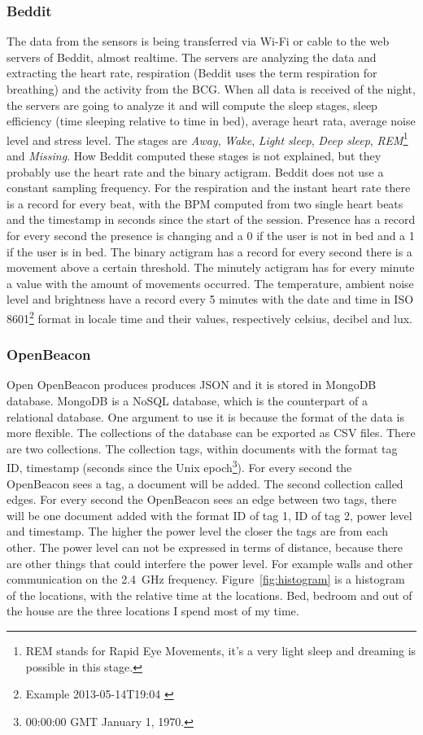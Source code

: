 		\subsubsection{Beddit}
		\label{sec:datadescriptionbeddit}
		The data from the sensors is being transferred via Wi-Fi or cable to the web servers of Beddit, almost realtime. The servers are analyzing the data and extracting the heart rate, respiration (Beddit uses the term respiration for breathing) and the activity from the BCG. When all data is received of the night, the servers are going to analyze it and will compute the sleep stages, sleep efficiency (time sleeping relative to time in bed), average heart rata, average noise level and stress level. The stages are \emph{Away}, \emph{Wake}, \emph{Light sleep}, \emph{Deep sleep}, \emph{REM}\footnote{REM stands for Rapid Eye Movements, it's a very light sleep and dreaming is possible in this stage.} and \emph{Missing}. How Beddit computed these stages is not explained, but they probably use the heart rate and the binary actigram. Beddit does not use a constant sampling frequency. For the respiration and the instant heart rate there is a record for every beat, with the BPM computed from two single heart beats and the timestamp in seconds since the start of the session. Presence has a record for every second the presence is changing and a 0 if the user is not in bed and a 1 if the user is in bed. The binary actigram has a record for every second there is a movement above a certain threshold. The minutely actigram has for every minute a value with the amount of movements occurred. The temperature, ambient noise level and brightness have a record every 5 minutes with the date and time in ISO 8601\footnote{Example 2013-05-14T19:04 \cite{iso8601}} format in locale time and their values, respectively celsius, decibel and lux.

		\subsubsection{OpenBeacon}
			Open OpenBeacon produces produces JSON and it is stored in MongoDB database. MongoDB is a NoSQL database, which is the counterpart of a relational database. One argument to use it is because the format of the data is more flexible. The collections of the database can be exported as CSV files.
			There are two collections. The collection tags, within documents with the format tag ID, timestamp (seconds since the Unix epoch\footnote{00:00:00 GMT January 1, 1970.}). For every second the OpenBeacon sees a tag, a document will be added.
			The second collection called edges. For every second the OpenBeacon sees an edge between two tags, there will be one document added with the format ID of tag 1, ID of tag 2, power level and timestamp.
			The higher the power level the closer the tags are from each other. The power level can not be expressed in terms of distance, because there are other things that could interfere the power level. For example walls and other communication on the \SI{2.4}{\giga\hertz} frequency. Figure~\ref{fig:histogram} is a histogram of the locations, with the relative time at the locations. Bed, bedroom and out of the house are the three locations I spend most of my time. 

